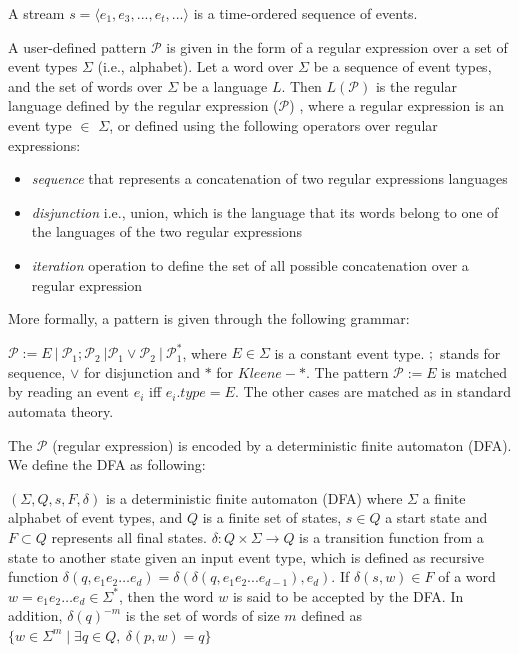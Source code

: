\begin{definition}
A stream $s=\langle e_1,e_3,...,e_t,...\rangle$  is a time-ordered sequence of events.
\end{definition}


\par A user-defined pattern $\mathcal{P}$ is given in the form of a regular expression over a set of event types $\Sigma$ (i.e., alphabet). Let a word over $\Sigma$ be a sequence of event types, and the set of words over $\Sigma$ be a language $L$. Then $L(\mathcal{P})$ is the regular language defined by the regular expression ($\mathcal{P}$) \cite{hopcroft2006automata,nuel_pattern_2008,alevizos2017event},  where a regular expression is an event type $\in$ $\Sigma$, or defined using the following operators over regular expressions:
 
\begin{itemize}[noitemsep]
	\item \textit{sequence} that represents a concatenation of two regular expressions languages 
	\item \textit{disjunction} i.e., union, which is the language that its words belong to one of the languages of the two regular expressions 
	\item \textit{iteration} operation to define the set of all possible concatenation over a regular expression
\end{itemize}

More formally, a pattern is given through the following grammar:
\begin{definition}
$\mathcal{P} := E\ |\ \mathcal{P}_{1} ; \mathcal{P}_{2}\ | \mathcal{P}_{1} \vee \mathcal{P}_{2}\ |\ \mathcal{P}_{1}^{*}  $, where $E \in \Sigma$ is a constant event type. $;$ stands for sequence, $\vee$ for disjunction and $*$ for $\mathit{Kleene}-*$.
The pattern $\mathcal{P} := E$ is matched by reading an event $e_i$ iff $e_{i}.type = E$.
The other cases are matched as in standard automata theory.
\end{definition}


The $\mathcal{P}$ (regular expression) is encoded by a deterministic finite automaton (DFA). We define the DFA as following: 

\begin{definition}
	$(\Sigma,Q,s,F,\delta)$ is a deterministic finite automaton (DFA)  where  $\Sigma$ a finite alphabet of event types, and $Q$ is a finite set of states, $s \in Q$ a start state and $F \subset Q$ represents all final states. $\delta: Q \times \Sigma \rightarrow Q$ is a transition function from a state to another state given an input event type, which is defined as recursive function $\delta(q,e_{1}e_{2}\ldots e_{d})=\delta(\delta(q,e_{1}e_{2}...e_{d-1}),e_{d})$. If $\delta(s,w) \in F$ of a word $w=e_{1}e_{2}\ldots e_{d} \in \Sigma^{*}$, then the word $w$ is said to be accepted by the DFA. In addition,  $\delta(q)^{-m}$ is the set of words of size $m$ defined as $\{w \in \Sigma^{m} \mid \exists q \in Q,\ \delta(p,w)=q \}$
\end{definition}


